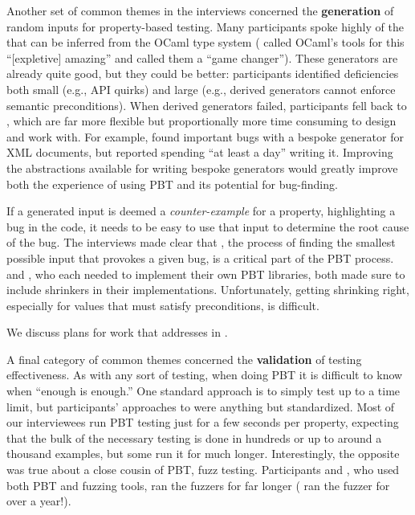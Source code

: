 \smallskip

Another set of common themes in the interviews concerned the {\bf generation} of
random inputs for property-based testing. Many participants spoke
highly of the  that can be inferred from
the OCaml type system ( called OCaml's tools for this
``[expletive] amazing'' and  called them a ``game changer'').
These generators are already quite good, but they could be better: participants
identified deficiencies both small (e.g., API quirks) and large (e.g.,
derived generators
cannot enforce semantic preconditions). When derived generators
failed, participants fell back to , which
are far more flexible but proportionally more time consuming to design and work
with. For example,  found important bugs with a bespoke
generator for XML documents,
but reported spending ``at least a day'' writing it.
Improving the abstractions available for writing bespoke generators would
greatly improve both the experience of using PBT and its potential for
bug-finding.

If a generated input is deemed a {\em counter-example} for a property,
highlighting a bug in the code, it needs to be easy to use that input to
determine the root cause of the bug. The interviews made clear that
, the process of finding the smallest possible input that
provokes a given bug, is a critical part of the PBT process.  
and , who each needed to implement their own PBT libraries, both
made sure to include shrinkers in their implementations. Unfortunately, getting
shrinking right, especially for values that must satisfy preconditions, is
difficult.

We discuss plans for work that addresses  in .

\smallskip

A final category of common themes concerned the {\bf validation} of testing
effectiveness. As with any sort of testing, when doing PBT it is difficult to
know when ``enough is enough.'' One standard approach is to simply test up to a
time limit, but participants' approaches to 
were anything but standardized.
Most of our interviewees run PBT testing just for a few seconds per property,
expecting that the bulk of the necessary testing is done in hundreds or up to
around a thousand examples, but some run it for much longer.
Interestingly, the opposite was true about a close cousin of PBT, fuzz testing.
Participants  and , who used both PBT and
fuzzing tools, ran the fuzzers for far longer
( ran the fuzzer for over a year!).

